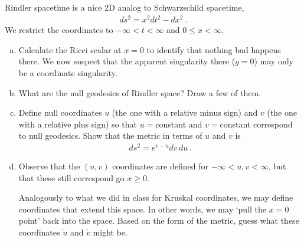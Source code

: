 \documentclass[12pt]{article}
\numberwithin{equation}{section}    %
\renewcommand{\tilde}{\widetilde}   %
\begin{document}
Rindler spacetime is a nice 2D analog to Schwarzschild spacetime,
\begin{align}
	ds^2 = x^2 dt^2 - dx^2 \ .
	\label{eq:original:Rindler}
\end{align}
We restrict the coordinates to $-\infty < t < \infty$ and $0 \leq x < \infty$. 
\begin{enumerate}[(a)]
	\item Calculate the Ricci scalar at $x=0$ to identify that nothing bad happens there. We now suspect that the apparent singularity there ($g = 0$) may only be a coordinate singularity.
	\item What are the null geodesics of Rindler space? Draw a few of them.
	\item Define null coordinates $u$ (the one with a relative minus sign) and $v$ (the one with a relative plus sign) so that $u=$constant and $v=$constant correspond to null geodesics. Show that the metric in terms of $u$ and $v$ is
	\begin{align}
		ds^2 = e^{v-u}dv\,du \ .
	\end{align}
	\item Observe that the $(u,v)$ coordinates are defined for $-\infty < u,v < \infty$, but that these still correspond go $x\geq 0$. 
	
		Analogously to what we did in class for Kruskal coordinates, we may define coordinates that extend this space. In other words, we may `pull the $x=0$ point' back into the space. Based on the form of the metric, guess what these coordinates $\tilde u$ and $\tilde v$ might be.
		

\end{enumerate}
\end{document}
